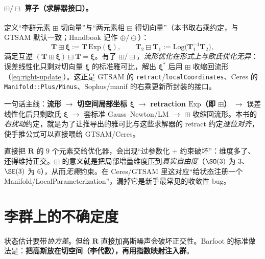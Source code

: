 \paragraph{$\boxplus/\boxminus$ 算子（求解器接口）。}定义“李群元素 $\boxplus$ 切向量”与“两元素相 $\boxminus$ 得切向量”（本书取右乘约定，与 GTSAM 默认一致；Handbook 记作 $\oplus/\ominus$）：
\begin{equation}
  \mathbf{T}\boxplus\boldsymbol{\xi}:=\mathbf{T}\,\mathrm{Exp}(\boldsymbol{\xi}),\qquad
  \mathbf{T}_2\boxminus\mathbf{T}_1:=\mathrm{Log}\big(\mathbf{T}_1^{-1}\mathbf{T}_2\big),
  \label{eq:boxplus}
\end{equation}
满足互逆 $(\mathbf{T}\boxplus\boldsymbol{\xi})\boxminus\mathbf{T}=\boldsymbol{\xi}$。有了 $\boxplus/\boxminus$，\emph{流形优化在形式上与欧氏优化无异}：误差线性化只剩对切向量 $\boldsymbol{\xi}$ 的标准雅可比，解出 $\boldsymbol{\xi}^*$ 后用 $\boxplus$ 收缩回流形（\cref{eq:right-update}）。这正是 GTSAM 的 \texttt{retract}/\texttt{localCoordinates}、Ceres 的 \texttt{Manifold::Plus/Minus}、Sophus/manif 的右乘更新所封装的接口。

\begin{insight}
一句话主线：\textbf{流形} $\to$ \textbf{切空间局部坐标 $\boldsymbol{\xi}$} $\to$ \textbf{retraction $\mathrm{Exp}$（即 $\boxplus$）} $\to$ 误差线性化后只剩欧氏 $\boldsymbol{\xi}$ $\to$ 套标准 Gauss–Newton/LM $\to$ $\boxplus$ 收缩回流形。本书的\emph{右扰动}约定，就是为了让推导出的雅可比与这些求解器的 retract 约定\emph{逐位对齐}，使手推公式可以直接喂给 GTSAM/Ceres。
\end{insight}

\begin{pitfall}
直接把 $\mathbf{R}$ 的 $9$ 个元素交给优化器，会出现“过参数化 + 约束破坏”：维度多了、还得维持正交。$\boxplus$ 的意义就是把局部增量维度压到\emph{真实自由度}（$\SO(3)$ 为 $3$、$\SE(3)$ 为 $6$），从而\emph{无需}约束。在 Ceres/GTSAM 里这对应“给状态注册一个 Manifold/LocalParameterization”，漏掉它是新手最常见的收敛性 bug。
\end{pitfall}

\section{李群上的不确定度}
\label{sec:uncertainty}

状态估计要带\emph{协方差}。但给 $\mathbf{R}$ 直接加高斯噪声会破坏正交性。Barfoot\cite{barfoot2024state} 的标准做法是：\textbf{把高斯放在切空间（李代数），再用指数映射注入群}。

